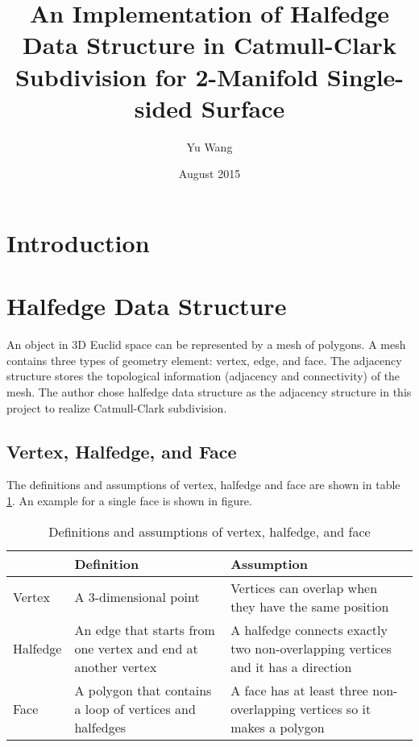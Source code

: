 \documentclass[12pt]{article}
\title{An Implementation of Halfedge Data Structure in Catmull-Clark Subdivision for 2-Manifold Single-sided Surface}
\author{Yu Wang}
\date{August 2015}
\begin{document}
\maketitle
\newpage


\section{Introduction}

\section{Halfedge Data Structure} \label{sec:halfedge}

An object in 3D Euclid space can be represented by a mesh of polygons. A mesh contains three types of geometry element: vertex, edge, and face. The adjacency structure stores the topological information (adjacency and connectivity) of the mesh. The author chose halfedge data structure as the adjacency structure in this project to realize Catmull-Clark subdivision.

\subsection{Vertex, Halfedge, and Face}

The definitions and assumptions of vertex, halfedge and face are shown in table \ref{table:vhfdef}. An example for a single face is shown in figure.
\begin{table}[h]
\centering
\begin{tabular}{| l | p{} | p{}|}
\hline
		&	Definition	& Assumption	\\
\hline
Vertex	&	A 3-dimensional point		&	Vertices can overlap when they have the same position		\\
\hline
Halfedge	&	An edge that starts from one vertex and end at another vertex & A halfedge connects exactly two non-overlapping vertices and it has a direction\\
\hline
Face		&	A polygon that contains a loop of vertices and halfedges	& A face has at least three non-overlapping vertices so it makes a polygon\\
\hline
\end{tabular}
\caption{Definitions and assumptions of vertex, halfedge, and face} 
\label{table:vhfdef}
\end{table}
\end{document}
